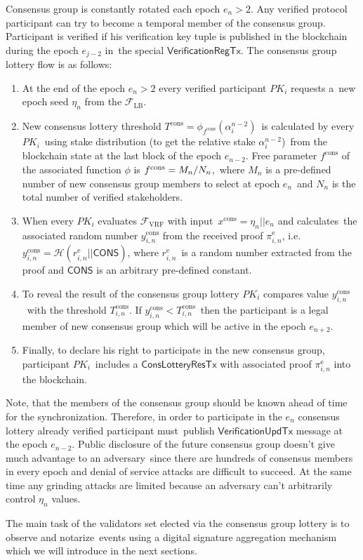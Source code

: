 Consensus group is constantly rotated each epoch ${e_n \gt 2}$.
Any verified protocol participant can try to become a temporal member of the consensus group.
Participant is verified if his verification key tuple is published in the blockchain during the epoch $e_{j-2}$ in\
the special $\textsf{VerificationRegTx}$.
The consensus group lottery flow is as follows:
\begin{enumerate}
    \item At the end of the epoch ${e_n \gt 2}$ every verified participant $PK_i$ requests a\
    new epoch seed $\eta_n$ from the ${\mathcal{F}}_{\text{LB}}$.
    \item New consensus lottery threshold $T^{\text{cons}} = \phi_{f^{\text{cons}}}(\alpha^{n-2}_i)$\
    is calculated by every $PK_i$\ using stake distribution (to get the relative stake $\alpha^{n - 2}_{i}$)\
    from the blockchain state at the last block of the epoch $e_{n - 2}$.
    Free parameter $f^{\text{cons}}$ of the associated function $\phi$ is ${f^{\text{cons}} = M_n /\/ N_n}$,\
    where $M_n$ is a pre-defined number of new consensus group members to select at epoch $e_n$\
    and $N_n$ is the total number of verified stakeholders.
    \item When every $PK_i$ evaluates ${\mathcal{F}}_{\text{VRF}}$ with input\
    $x^{\text{cons}} = \eta_n || e_n $ and calculates\
    the associated random number $y_{i, n}^{\text{cons}}$ from the received proof $\pi_{i, n}^{\text{e}}$, i.e.\
    ${y_{i, n}^{\text{cons}} = \mathcal{H}(r_{i, n}^{\text{e}}||\textsf{CONS})}$, where $r_{i, n}^{\text{e}}$\
    is a random number extracted from the proof and $\textsf{CONS}$ is an arbitrary pre-defined constant.
    \item To reveal the result of the consensus group lottery $PK_i$ compares value $y_{i, n}^{\text{cons}}$\
    with the threshold $T_{i, n}^{\text{cons}}$.
    If ${y_{i, n}^{\text{cons}} < T_{i, n}^{\text{cons}}}$\
    then the participant is a legal member of new consensus group which will be active in the epoch $e_{n+2}$.
    \item Finally, to declare his right to participate in the new consensus group, participant $PK_i$\
    includes a $\textsf{ConsLotteryResTx}$ with associated proof $\pi_{i, n}^{\text{e}}$ into the blockchain.
\end{enumerate}
Note, that the members of the consensus group should be known ahead of time for the synchronization.
Therefore, in order to participate in the $e_n$ consensus lottery already verified participant must\
publish $\textsf{VerificationUpdTx}$ message at the epoch $e_{n-2}$.
Public disclosure of the future consensus group doesn't give much advantage to an adversary\
since there are hundreds of consensus members in every epoch and denial of service attacks are difficult to succeed.
At the same time any grinding attacks are limited because an adversary can't arbitrarily control $\eta_n$ values.

The main task of the validators set elected via the consensus group lottery is to observe and notarize\
events using a digital signature aggregation mechanism which we will introduce in the next sections.
